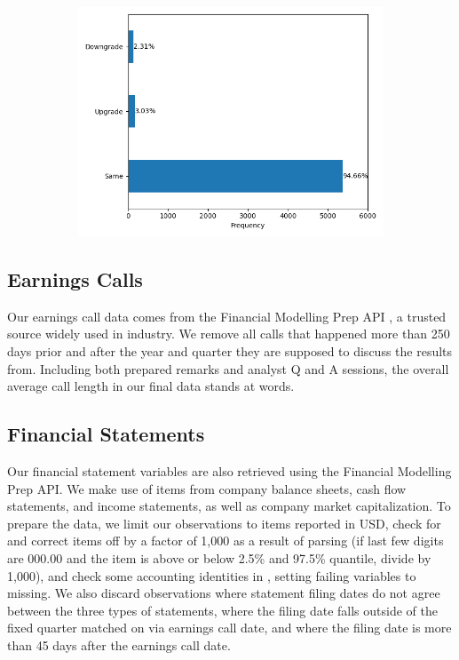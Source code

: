\documentclass{article}[11pt]
\begin{document}
\begin{figure}
\begin{subfigure}[h]{0.4925\textwidth}
            \includegraphics[width=0.95\hsize]{../Output/All Data EDA/Tabular EDA/Change_Short_no_title.png}
        \end{subfigure}
        \hfill
        \label{fig:credit-ratings}
    \end{figure}

    \subsection*{Earnings Calls}

    Our earnings call data comes from the Financial Modelling Prep API \citep{financial_modeling_prep_financial_2024}, a trusted source widely used in industry. We remove all calls that happened more than 250 days prior and after the year and quarter they are supposed to discuss the results from. Including both prepared remarks and analyst Q and A sessions, the overall average call length in our final data stands at \avgCallLength \space words.

    \subsection*{Financial Statements}

    Our financial statement variables are also retrieved using the Financial Modelling Prep API. We make use of items from company balance sheets, cash flow statements, and income statements, as well as company market capitalization. To prepare the data, we limit our observations to items reported in USD, check for and correct items off by a factor of 1,000 as a result of parsing (if last few digits are 000.00 and the item is above or below 2.5\% and 97.5\% quantile, divide by 1,000), and check some accounting identities in \cite{das_credit_2023}, setting failing variables to missing. We also discard observations where statement filing dates do not agree between the three types of statements, where the filing date falls outside of the fixed quarter matched on via earnings call date, and where the filing date is more than 45 days after the earnings call date.
\end{document}
